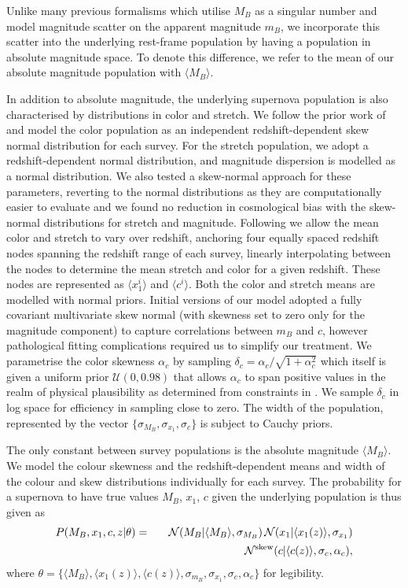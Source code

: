 \documentclass[a4paper,fleqn,usenatbib,manuscript]{emulateapj}
\newcommand{\rubin}{\citetalias{Rubin2015}}
\begin{document}
Unlike many previous formalisms which utilise $M_B$ as a singular number and model magnitude scatter on the apparent magnitude $m_B$, we incorporate this scatter into the underlying rest-frame population by having a population in absolute magnitude space. To denote this difference, we refer to the mean of our absolute magnitude population with $\langle M_B \rangle$.

In addition to absolute magnitude, the underlying supernova population is also characterised by distributions in color and stretch. We follow the prior work of {\rubin} and model the color population as an independent redshift-dependent skew normal distribution for each survey. For the stretch population, we adopt a redshift-dependent normal distribution, and magnitude dispersion is modelled as a normal distribution. We also tested a skew-normal approach for these parameters, reverting to the normal distributions as they are computationally easier to evaluate and we found no reduction in cosmological bias with the skew-normal distributions for stretch and magnitude. Following {\rubin} we allow the mean color and stretch to vary over redshift, anchoring four equally spaced redshift nodes spanning the redshift range of each survey, linearly interpolating between the nodes to determine the mean stretch and color for a given redshift. These nodes are represented as $\langle x_1^i \rangle$ and $\langle c^i \rangle$. Both the color and stretch means are modelled with normal priors. Initial versions of our model adopted a fully covariant multivariate skew normal (with skewness set to zero only for the magnitude component) to capture correlations between $m_B$ and $c$, however pathological fitting complications required us to simplify our treatment. We parametrise the color skewness $\alpha_c$ by sampling $\delta_c = \alpha_c / \sqrt{1 + \alpha_c^2}$ which itself is given a uniform prior $\mathcal{U}(0,0.98)$ that allows $\alpha_c$ to span positive values in the realm of physical plausibility as determined from constraints in \citet{Scolnic2016}. We sample $\delta_c$ in log space for efficiency in sampling close to zero. The width of the population, represented by the vector $\lbrace \sigma_{M_B}, \sigma_{x_1}, \sigma_c \rbrace$ is subject to Cauchy priors. 

The only constant between survey populations is the absolute magnitude $\langle M_B \rangle$. We model the colour skewness and the redshift-dependent means and width of the colour and skew distributions individually for each survey. The probability for a supernova to have true values $M_B$, $x_1$, $c$ given the underlying population is thus given as
\begin{eqnarray}
P(M_B, x_1, c, z | \theta) &=& \mathcal{N}(M_B|\langle M_B \rangle, \sigma_{M_B}) \, \mathcal{N}(x_1 | \langle x_1(z) \rangle, \sigma_{x_1})\notag\\ &\quad\quad& \mathcal{N}^{\rm{skew}}(c| \langle c(z) \rangle, \sigma_c, \alpha_c) \label{eq:l1},
\end{eqnarray}
where $\theta = \lbrace \langle M_B \rangle, \langle x_1(z) \rangle, \langle c(z) \rangle, \sigma_{m_B}, \sigma_{x_1}, \sigma_c, \alpha_c \rbrace$ for legibility.
\end{document}
